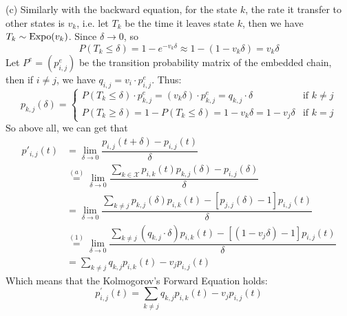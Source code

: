 \begin{homeworkProblem}
(c) Similarly with the backward equation, for the state $k$, the rate it transfer to other states is $v_k$, i.e. let $T_k$ be the time it leaves state $k$, then we have $T_k\sim\operatorname{Expo}(v_k)$. Since $\delta\to 0$, so
$$P(T_k\leq\delta)=1-e^{-v_k\delta}\approx 1-(1-v_k\delta)=v_k\delta$$
Let $P^e=\left(p_{i,j}^e\right)$ be the transition probability matrix of the embedded chain, then if $i\neq j$, we have $q_{i,j}=v_i\cdot p_{i,j}^e$. Thus:
\begin{equation}
p_{k,j}(\delta) = \begin{cases}
P(T_k\leq\delta)\cdot p_{k,j}^e = (v_k\delta)\cdot p_{k,j}^e = q_{k,j}\cdot\delta & \text{if } k\neq j \\
P(T_k\geq\delta) = 1 - P(T_k\leq\delta) = 1 - v_k\delta = 1 - v_j\delta & \text{if } k=j
\end{cases}
\end{equation}
So above all, we can get that
\begin{align*}
p'_{i,j}(t) &= \lim_{\delta\to 0}\dfrac{p_{i,j}(t+\delta)-p_{i,j}(t)}{\delta} \\
&\stackrel{(a)}{=} \lim_{\delta\to 0}\dfrac{\sum\limits_{k\in\mathcal{X}}p_{i,k}(t)p_{k,j}(\delta)-p_{i,j}(\delta)}{\delta} \\
&= \lim_{\delta\to 0}\dfrac{\sum\limits_{k\neq j}p_{k,j}(\delta)p_{i,k}(t)-\left[p_{j,j}(\delta)-1\right]p_{i,j}(t)}{\delta} \\
&\stackrel{(1)}{=} \lim_{\delta\to 0}\dfrac{\sum\limits_{k\neq j}\left(q_{k,j}\cdot\delta\right)p_{i,k}(t)-\left[\left(1 - v_j\delta\right) -1\right]p_{i,j}(t)}{\delta} \\
&= \sum_{k \neq j} q_{k,j}p_{i,k}(t)-v_j p_{i, j}(t)
\end{align*}
Which means that the Kolmogorov's Forward Equation holds:
$$p_{i, j}^{\prime}(t)=\sum_{k \neq j} q_{k, j} p_{i, k}(t)-v_j p_{i, j}(t)$$

\end{homeworkProblem}

\newpage